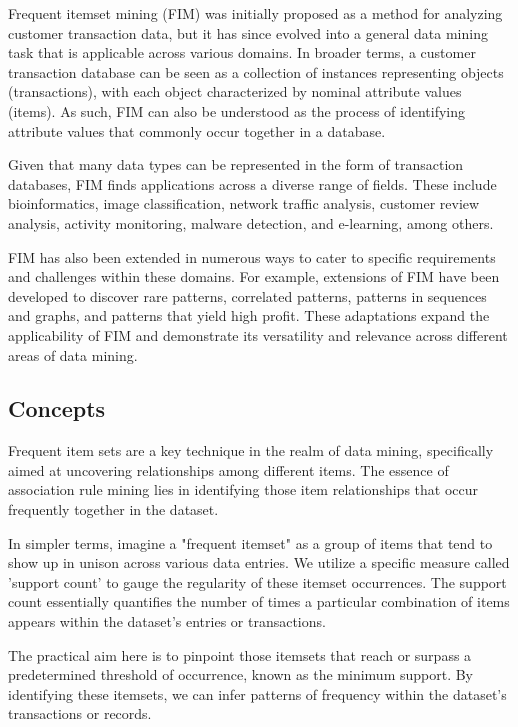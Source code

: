 Frequent itemset mining (FIM) was initially proposed as a method for analyzing customer transaction data, but it has since evolved into a general data mining task that is applicable across various domains. In broader terms, a customer transaction database can be seen as a collection of instances representing objects (transactions), with each object characterized by nominal attribute values (items). As such, FIM can also be understood as the process of identifying attribute values that commonly occur together in a database.

Given that many data types can be represented in the form of transaction databases, FIM finds applications across a diverse range of fields. These include bioinformatics, image classification, network traffic analysis, customer review analysis, activity monitoring, malware detection, and e-learning, among others.

FIM has also been extended in numerous ways to cater to specific requirements and challenges within these domains. For example, extensions of FIM have been developed to discover rare patterns, correlated patterns, patterns in sequences and graphs, and patterns that yield high profit. These adaptations expand the applicability of FIM and demonstrate its versatility and relevance across different areas of data mining.

\subsection{Concepts}
Frequent item sets are a key technique in the realm of data mining\cite{fim_geeksforgeeks},
specifically aimed at uncovering relationships among different items.
The essence of association rule mining lies in identifying those item relationships that occur frequently together in the dataset.

In simpler terms, imagine a "frequent itemset" as a group of items that tend to show up in unison across various data entries. We utilize a specific measure called 'support count' to gauge the regularity of these itemset occurrences. The support count essentially quantifies the number of times a particular combination of items appears within the dataset's entries or transactions.

The practical aim here is to pinpoint those itemsets that reach or surpass a predetermined threshold of occurrence, known as the minimum support. By identifying these itemsets, we can infer patterns of frequency within the dataset's transactions or records.

